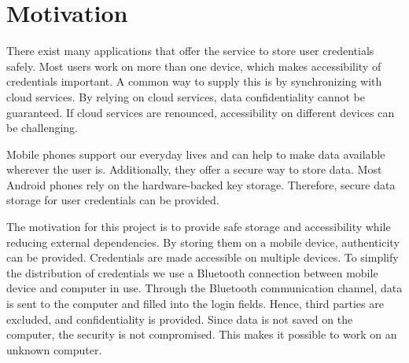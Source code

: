 \section{Motivation} \label{motivation}

There exist many applications that offer the service to store user credentials safely. Most users work on more than one device, which makes accessibility of credentials important.
A common way to supply this is by synchronizing with cloud services. By relying on cloud services, data confidentiality cannot be guaranteed. If cloud services are renounced, accessibility on different devices can be challenging.

Mobile phones support our everyday lives and can help to make data available wherever the user is. Additionally, they offer a secure way to store data. Most Android phones rely on the hardware-backed key storage. Therefore, secure data storage for user credentials can be provided. 

The motivation for this project is to provide safe storage and accessibility while reducing external dependencies. By storing them on a mobile device, authenticity can be provided. Credentials are made accessible on multiple devices. To simplify the distribution of credentials we use a Bluetooth connection between mobile device and computer in use. Through the Bluetooth communication channel, data is sent to the computer and filled into the login fields. Hence, third parties are excluded, and confidentiality is provided. Since data is not saved on the computer, the security is not compromised. This makes it possible to work on an unknown computer.

